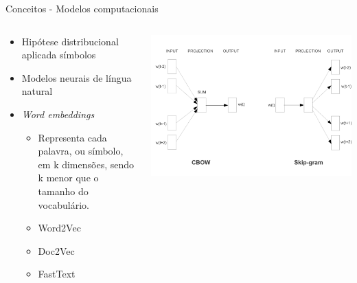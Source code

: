 \begin{frame}{Conceitos - Modelos computacionais}

\begin{columns}
	\begin{column}{0.60\textwidth}\selectFont
		\begin{tcolorbox}[title=Modelo de representação distribuída,valign=center]
			\begin{itemize}
				\item Hipótese distribucional aplicada símbolos
				\item Modelos neurais de língua natural \cite{Bengio2003}
				\item {\it Word embeddings} 
				\begin{itemize}\selectFont
					\item Representa cada palavra, ou símbolo, em k dimensões, sendo k menor que o tamanho do vocabulário.
					\item Word2Vec \cite{Mikolov2013}
					\item Doc2Vec \cite{QuocLe2014}
					\item FastText 
				\end{itemize}
			\end{itemize}
		\end{tcolorbox}
	\end{column}
	\begin{column}{0.40\textwidth}
		\begin{tcolorbox}[title=Modelo Word2Vec,valign=center]
		   \includegraphics[width=.99\textwidth]{images/efficient-models.pdf}
		\end{tcolorbox}
	\end{column}
\end{columns}

\end{frame}
